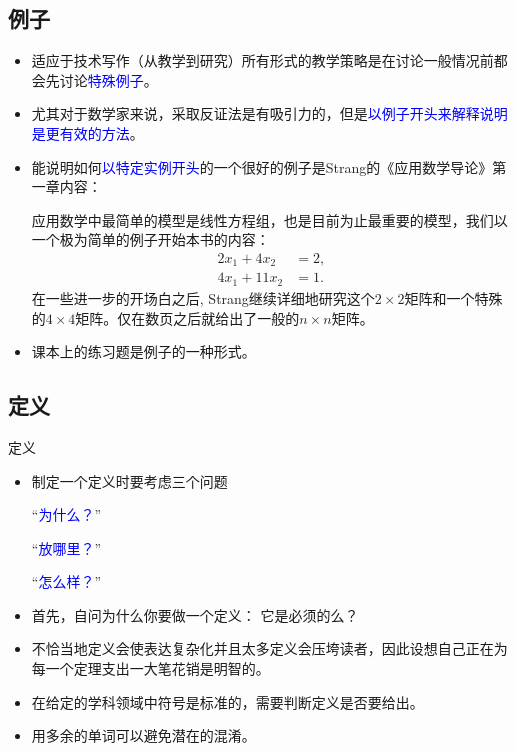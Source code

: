 \documentclass[13pt]{ctexbeamer}
\newcommand{\blue}[1]{\textcolor{blue}{#1}}
\begin{document}
\subsection{例子}

\begin{frame}
\begin{itemize}
	\item 
适应于技术写作（从教学到研究）所有形式的教学策略是在讨论一般情况前都会先讨论\blue{特殊例子}。
\item 
尤其对于数学家来说，采取反证法是有吸引力的，但是\blue{以例子开头来解释说明是更有效的方法}。
\item 
能说明如何\blue{以特定实例开头}的一个很好的例子是Strang的《应用数学导论》第一章内容：

{\small
应用数学中最简单的模型是线性方程组，也是目前为止最重要的模型，我们以一个极为简单的例子开始本书的内容：
\begin{align*}
	2 x_1+ 4 x_2& =2,\\
	4 x_1 +11x_2 & =1.
\end{align*}
在一些进一步的开场白之后, Strang继续详细地研究这个$2\times 2$矩阵和一个特殊的$4\times 4$矩阵。仅在数页之后就给出了一般的$n \times n$矩阵。}

\item 课本上的\alert{练习题}是例子的一种形式。
\end{itemize}


\end{frame}


\subsection{定义}
\begin{frame}{定义}
\begin{itemize}
\item 
制定一个定义时要考虑三个问题

``\blue{为什么？}'' 

``\blue{放哪里？}'' 

``\blue{怎么样？}'' 
\item 
首先，自问为什么你要做一个定义： 它是必须的么？
\item 
不恰当地定义会使表达复杂化并且太多定义会压垮读者，因此设想自己正在为每一个定理支出一大笔花销是明智的。
\item 
在给定的学科领域中符号是标准的，需要判断定义是否要给出。
\item 
用多余的单词可以避免潜在的混淆。
\end{itemize}
\end{frame}
\end{document}
